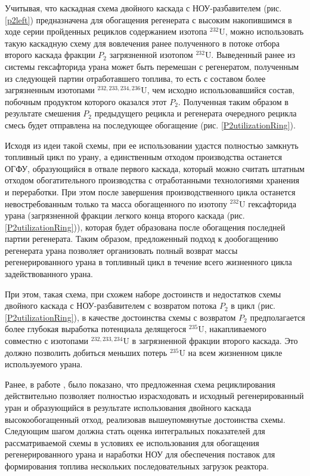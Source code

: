 Учитывая, что каскадная схема двойного каскада с НОУ-разбавителем (рис. \ref{p2left}) предназначена для обогащения регенерата с высоким накопившимся в ходе серии пройденных рециклов содержанием изотопа $^{232}$U, можно использовать такую каскадную схему для вовлечения ранее полученного в потоке отбора второго каскада фракции $P_2$ загрязненной изотопом $^{232}$U. Выведенный ранее из системы гексафторида урана может быть перемешан с регенератом, полученным из следующей партии отработавшего топлива, то есть с составом более загрязненным изотопами $^{232,233,234,236}$U, чем исходно использовавшийся состав, побочным продуктом которого оказался этот $P_2$. Полученная таким образом в результате смешения $P_2$ предыдущего рецикла и регенерата очередного рецикла смесь будет отправлена на последующее обогащение (рис. \ref{P2utilizationRing}).

Исходя из идеи такой схемы, при ее использовании удастся полностью замкнуть топливный цикл по урану, а единственным отходом производства останется ОГФУ, образующийся в отвале первого каскада, который можно считать штатным отходом обогатительного производства с отработанными технологиями хранения и переработки. При этом после завершения производственного цикла останется невостребованным только та масса обогащенного по изотопу $^{232}$U гексафторида урана (загрязненной фракции легкого конца второго каскада (рис. \ref{P2utilizationRing})), которая будет образована после обогащения последней партии регенерата. Таким образом, предложенный подход к дообогащению регенерата урана позволяет организовать полный возврат массы регенерированного урана в топливный цикл в течение всего жизненного цикла задействованного урана.

При этом, такая схема, при схожем наборе достоинств и недостатков схемы двойного каскада с НОУ-разбавителем с возвратом потока $P_2$ в цикл (рис. \ref{P2utilizationRing}), в качестве достоинства схемы с возвратом $P_2$ предполагается более глубокая выработка потенциала делящегося $^{235}$U, накапливаемого совместно с изотопами $^{232,233,234}$U в загрязненной фракции второго каскада. Это должно позволить добиться меньших потерь $^{235}$U на всем жизненном цикле используемого урана.


Ранее, в работе \cite{nevinicaToplivnyyCiklLegkovodnogo2019}, было показано, что предложенная схема рециклирования действительно позволяет полностью израсходовать и исходный регенерированный уран и образующийся в результате использования двойного каскада высокообогащенный отход, реализовав вышеупомянутые достоинства схемы. Следующим шагом должна стать оценка интегральных показателей для рассматриваемой схемы в условиях ее использования для обогащения регенерированного урана и наработки НОУ для обеспечения поставок для формирования топлива нескольких последовательных загрузок реактора.

